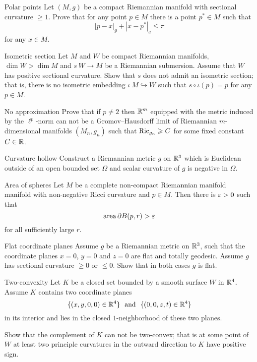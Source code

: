 \documentclass[twoside]{book}
\begin{document}
\begin{pr}{\many}{Polar points} \label{milka-polar} Let $(M,g)$ be a compact Riemannian manifold with sectional curvature $\ge 1$. 
Prove that for any point $p\in M$ there is a point $p^*\in M$ such that 
\[|p-x|_g+|x-p^*|_g\le \pi\]
for any $x\in M$.
\end{pr}

\begin{pr}{\hard}{Isometric section}\label{Isometric section}
Let $M$ and $W$ be compact Riemannian manifolds,
$\dim W>\dim M$
and $s\:W\to M$ be a Riemannian submersion.
Assume that $W$ has positive sectional curvature.
Show that $s$ does not admit an isometric section;
that is, there is no isometric embedding $\iota\:M\hookrightarrow W$ such that $s\circ\iota(p)=p$ for any $p\in M$.
\end{pr}


\begin{pr}{\many}{No approximation}\label{No approximation}
Prove that if $p\not=2$ then $\mathbb{R}^m$ 
equipped with the metric induced by the $\ell^p$-norm 
can not be a
Gromov--Hausdorff limit of
Riemannian $m$-dimensional manifolds $(M_n,g_n)$ such that $\Ric_{g_n}\z\ge C$ for some fixed constant $C\in\mathbb{R}$.
\end{pr}

\begin{pr}{}{Curvature hollow}\label{Curvature hollow}
Construct a Riemannian metric $g$ on $\mathbb{R}^3$ 
which is Euclidean outside of an open bounded set $\Omega$ 
and scalar curvature of $g$ is negative in $\Omega$.
\end{pr}

\begin{pr}{}{Area of spheres}\label{Area of spheres}
Let $M$ be a complete non-compact Riemannian manifold manifold 
with non-negative Ricci curvature and $p\in M$.
Then there is $\varepsilon>0$ such that 
$$\operatorname{\rm area}\partial B(p,r)>\varepsilon$$
for all sufficiently large $r$.
\end{pr}


\begin{pr}{}{Flat coordinate planes}\label{Flat coordinate planes}
Assume $g$ be a Riemannian metric on $\mathbb{R}^3$,
such that the coordinate planes $x=0$, $y=0$ and $z=0$ are flat and totally geodesic.
Assume $g$ has sectional curvature $\ge 0$ or $\le 0$.
Show that in both cases $g$ is flat. 
\end{pr}

\begin{pr}{\many}{Two-convexity}\label{Two-convexity}
Let $K$ be a closed set bounded by a smooth surface $W$
in $\mathbb{R}^4$.
Assume $K$ contains two coordinate planes $$\{(x,y,0,0)\in\RR^4\}\ \ 
\text{and}
\ \ \{(0,0,z,t)\in\RR^4\}$$
in its interior 
and lies in the closed $1$-neighborhood of these two planes.

Show that the complement of $K$ can not be two-convex;
that is at some point of $W$ at least two principle curvatures in the outward direction to $K$
have positive sign.
\end{pr}
\end{document}
